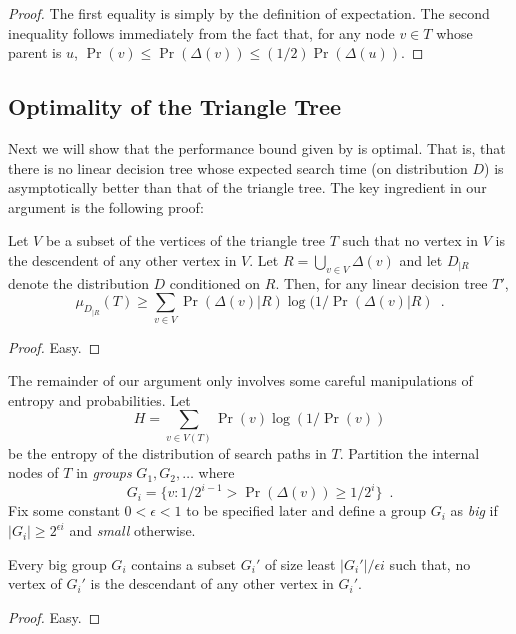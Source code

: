\documentclass[charterfonts,lotsofwhite]{patmorin}
\begin{document}
\begin{proof}
The first equality is simply by the definition of expectation.  The
second inequality follows immediately from the fact that, for any node
$v\in T$ whose parent is $u$, $\Pr(v)\le \Pr(\Delta(v))\le (1/2)\Pr(\Delta(u))$.
\end{proof}


\subsection{Optimality of the Triangle Tree}

Next we will show that the performance bound given by
 is optimal.  That is, that there is no linear
decision tree whose expected search time (on distribution $D$) is
asymptotically better than that of the triangle tree.
The key ingredient in our argument is the following proof:

\begin{lem}
Let $V$ be a subset of the vertices of the triangle tree $T$ such that
no vertex in $V$ is the descendent of any other vertex in $V$.  Let
$R=\bigcup_{v\in V} \Delta(v)$ and let $D_{|R}$ denote the
distribution $D$ conditioned on $R$.  Then, for any linear decision
tree $T'$,
\[
    \mu_{D_{|R}}(T) 
	\ge \sum_{v\in V}\Pr(\Delta(v)|R)\log(1/\Pr(\Delta(v)|R) \enspace .
\]
\end{lem}

\begin{proof}
Easy.
\end{proof}

The remainder of our argument only involves some careful manipulations
of entropy and probabilities.  Let
\[
   H = \sum_{v\in V(T)} \Pr(v)\log (1/\Pr(v))
\] 
be the entropy of the distribution of search paths in $T$.
Partition the internal nodes of $T$ in \emph{groups} $G_1,G_2,\ldots$
where
\[
	G_i = \{v : 1/2^{i-1} > \Pr(\Delta(v)) \ge 1/2^i \} \enspace .
\]
Fix some constant $0< \epsilon< 1$ to be specified later and define a
group $G_i$ as \emph{big} if $|G_i|\ge 2^{\epsilon i}$ and
\emph{small} otherwise.

\begin{lem}
Every big group $G_i$ contains a subset $G_i'$ of size least
$|G_i'|/\epsilon i$ such that, no vertex of $G_i'$ is the
descendant of any other vertex in $G_{i}'$.
\end{lem}

\begin{proof}
Easy.
\end{proof}
\end{document}
